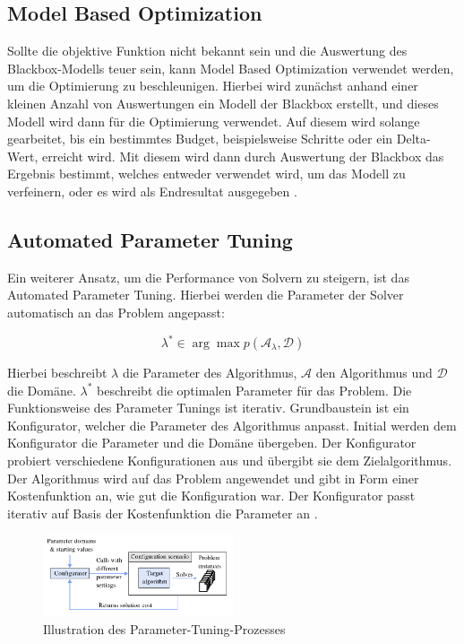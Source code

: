 \subsection{Model Based Optimization}
\label{sec:Model-Based-Optimization}

Sollte die objektive Funktion nicht bekannt sein und die Auswertung des
Blackbox-Modells teuer sein, kann Model Based Optimization verwendet werden, um
die Optimierung zu beschleunigen. Hierbei wird zunächst anhand einer kleinen
Anzahl von Auswertungen ein Modell der Blackbox erstellt, und dieses Modell wird
dann für die Optimierung verwendet. Auf diesem wird solange gearbeitet, bis ein
bestimmtes Budget, beispielsweise Schritte oder ein Delta-Wert, erreicht wird.
Mit diesem wird dann durch Auswertung der Blackbox das Ergebnis bestimmt,
welches entweder verwendet wird, um das Modell zu verfeinern, oder es wird als
Endresultat ausgegeben \cite[4]{bisch18pr}.


\subsection{Automated Parameter Tuning}
\label{sec:Automated-Parameter-Tuning}

Ein weiterer Ansatz, um die Performance von Solvern zu steigern, ist das
Automated Parameter Tuning. Hierbei werden die Parameter der Solver automatisch
an das Problem angepasst:

\[
\lambda^{*} \in \arg\max p(\mathcal{A}_{\lambda}, \mathcal{D})
\]

Hierbei beschreibt \(\lambda\) die Parameter des Algorithmus, \(\mathcal{A}\)
den Algorithmus und \(\mathcal{D}\) die Domäne. \(\lambda^{*}\) beschreibt die
optimalen Parameter für das Problem. Die Funktionsweise des Parameter Tunings
ist iterativ. Grundbaustein ist ein Konfigurator, welcher die Parameter des
Algorithmus anpasst. Initial werden dem Konfigurator die Parameter und die
Domäne übergeben. Der Konfigurator probiert verschiedene Konfigurationen aus und
übergibt sie dem Zielalgorithmus. Der Algorithmus wird auf das Problem
angewendet und gibt in Form einer Kostenfunktion an, wie gut die Konfiguration
war. Der Konfigurator passt iterativ auf Basis der Kostenfunktion die Parameter
an \cite[31-38]{kotth23pr}.

\begin{figure}[h]
    \centering
    \includegraphics[width=0.5\textwidth]{figures/Automated Parameter Tuning [kotth23pr].PNG}
    \caption{Illustration des Parameter-Tuning-Prozesses \cite[34]{kotth23pr}}
    \label{fig:bild}
\end{figure}

